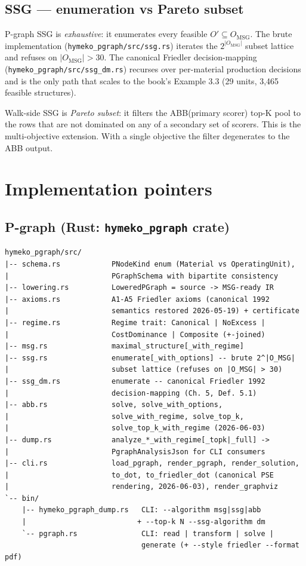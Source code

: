 \documentclass[11pt]{article}
\begin{document}
\subsection{SSG --- enumeration vs Pareto subset}

P-graph SSG is \emph{exhaustive}: it enumerates every feasible
$O' \subseteq O_\mathrm{MSG}$. The brute implementation
(\texttt{hymeko\_pgraph/src/ssg.rs}) iterates the
$2^{|O_\mathrm{MSG}|}$ subset lattice and refuses on
$|O_\mathrm{MSG}| > 30$. The canonical Friedler decision-mapping
(\texttt{hymeko\_pgraph/src/ssg\_dm.rs}) recurses over per-material
production decisions and is the only path that scales to the book's
Example 3.3 (29 units, 3{,}465 feasible structures).

Walk-side SSG is \emph{Pareto subset}: it filters the
ABB(primary scorer) top-K pool to the rows that are not dominated on
any of a secondary set of scorers. This is the multi-objective
extension. With a single objective the filter degenerates to the
ABB output.

\section{Implementation pointers}

\subsection{P-graph (Rust: \texttt{hymeko\_pgraph} crate)}

\begin{lstlisting}
hymeko_pgraph/src/
|-- schema.rs            PNodeKind enum (Material vs OperatingUnit),
|                        PGraphSchema with bipartite consistency
|-- lowering.rs          LoweredPGraph = source -> MSG-ready IR
|-- axioms.rs            A1-A5 Friedler axioms (canonical 1992
|                        semantics restored 2026-05-19) + certificate
|-- regime.rs            Regime trait: Canonical | NoExcess |
|                        CostDominance | Composite (+-joined)
|-- msg.rs               maximal_structure[_with_regime]
|-- ssg.rs               enumerate[_with_options] -- brute 2^|O_MSG|
|                        subset lattice (refuses on |O_MSG| > 30)
|-- ssg_dm.rs            enumerate -- canonical Friedler 1992
|                        decision-mapping (Ch. 5, Def. 5.1)
|-- abb.rs               solve, solve_with_options,
|                        solve_with_regime, solve_top_k,
|                        solve_top_k_with_regime (2026-06-03)
|-- dump.rs              analyze_*_with_regime[_topk|_full] ->
|                        PgraphAnalysisJson for CLI consumers
|-- cli.rs               load_pgraph, render_pgraph, render_solution,
|                        to_dot, to_friedler_dot (canonical PSE
|                        rendering, 2026-06-03), render_graphviz
`-- bin/
    |-- hymeko_pgraph_dump.rs   CLI: --algorithm msg|ssg|abb
    |                          + --top-k N --ssg-algorithm dm
    `-- pgraph.rs               CLI: read | transform | solve |
                                generate (+ --style friedler --format pdf)
\end{lstlisting}
\end{document}
